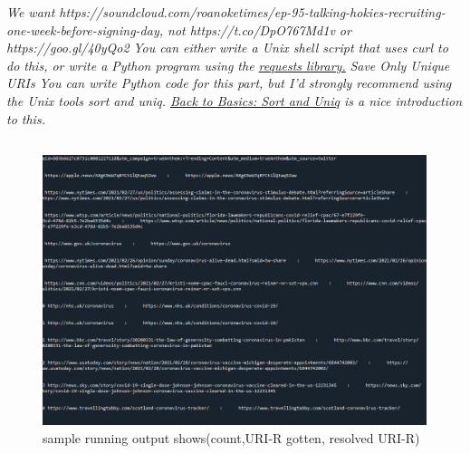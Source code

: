 \documentclass[12pt]{article}
\begin{document}
\emph{We want https://soundcloud.com/roanoketimes/ep-95-talking-hokies-recruiting-one-week-before-signing-day, not https://t.co/DpO767Md1v or https://goo.gl/40yQo2}
\newline
\newline
\emph{You can either write a Unix shell script that uses curl to do this, or write a Python program using the \href{https://requests.readthedocs.io/en/master/}{requests library.}}
\emph{Save Only Unique URIs}
\newline
\newline
\emph{You can write Python code for this part, but I'd strongly recommend using the Unix tools sort and uniq. \href{https://www.linuxjournal.com/content/back-basics-sort-and-uniq}{Back to Basics: Sort and Uniq} is a nice introduction to this.}


\subsection*{\color{blue}{Answer}}
\begin{figure}[H]
    \centering
    \includegraphics[trim=0 10 0 80, clip, width=\textwidth] {running.PNG}
    \caption{sample running output shows(count,URI-R gotten, resolved URI-R)}
    \label{fig:Running output}
\end{figure}


\end{document}
